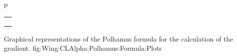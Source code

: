 \documentclass[[12pt,twoside]{book}
\begin{document}
\EnlargedFigureX%
  {p}%
  {%
    \centering
    \begin{tabular}{@{}c@{}}
      \subfloat%
          [%
            \smash{$C_{L_\mathlarger{\alpha}}$} as $\Mach$ changes, for different values of parameter $\AR$.
          ]%
          {\label{fig:Wing:CLAlpha:Polhamus:Formula:Plots:A}%
		      \includegraphics%
		        [width=0.45\textwidth]%
		        {Chapter_2/lift_gradient_polhamus_formula/plot_wing_CLalpha_LamLE15_lam05.pdf}%
          }%
      \\
      \subfloat%
          [%
            \smash{$C_{L_\mathlarger{\alpha}}$} as $\Mach$ changes, for different values of parameter $\Lambda_\text{le}$.
          ]%
          {\label{fig:Wing:CLAlpha:Polhamus:Formula:Plots:B}%
		      \includegraphics%
		        [width=0.45\textwidth]%
		        {Chapter_2/lift_gradient_polhamus_formula/plot_wing_CLalpha_lam05_AR5.pdf}%
          }%
      \\
      \subfloat%
          [%
            \smash{$C_{L_\mathlarger{\alpha}}$} as $\Mach$ changes, for different values of parameter $\lambda$.
          ]%
          {\label{fig:Wing:CLAlpha:Polhamus:Formula:Plots:C}%
		      \includegraphics%
		        [width=0.45\textwidth]%
		        {Chapter_2/lift_gradient_polhamus_formula/plot_wing_CLalpha_LamLE15_AR5.pdf}%
          }%
    \end{tabular}
  }%
  {
    Graphical representations of the Polhamus formula for the calculation of the   gradient.%
  }%
  {fig:Wing:CLAlpha:Polhamus:Formula:Plots}%
%
\end{document}
